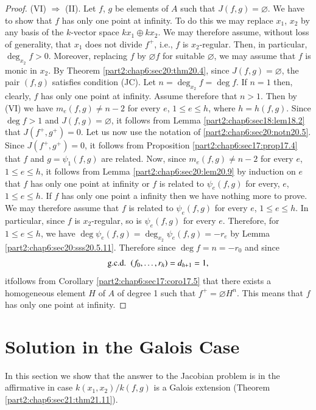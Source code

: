 \begin{proof}
(VI) $\Rightarrow$ (II). Let $f$, $g$ be elements of $A$ such that
$J(f, g) = \diameter$. We have to show that $f$ has only one point at
infinity. To do this we may replace $x_1$, $x_2$ by any basis of the
$k$-vector space $kx_1 \oplus kx_2$. We may therefore assume, without
loss of generality, that $x_1$ does not divide $f^+$, i.e., $f$ is
$x_2$-regular. Then, in particular, $\deg_{x_2} f> 0$. Moreover,
replacing $f$ by $\diameter f$ for suitable $\diameter$, we may assume
that $f$ is monic in $x_2$. By Theorem
\ref{part2:chap6:sec20:thm20.4}, since $J(f, g)= \diameter$, the pair
$(f, g)$ satisfies condition (JC). Let $n = \deg_{x_2}f= \deg f$. If
$n=1$ then, clearly, $f$ has only one point at infinity. Assume
therefore that $n > 1$. Then by (VI) we have $m_e (f, g) \neq n-2$ for
every $e$, $1 \leq e \leq h$, where $h= h(f, g)$. Since $\deg f> 1$
and $J(f, g)= \diameter$, it follows from Lemma
\ref{part2:chap6:sec18:lem18.2} that $J(f^+, g^+)=0$. Let us now use
the notation of \ref{part2:chap6:sec20:notn20.5}. Since $J(f^+,
g^+)=0$, it follows from Proposition \ref{part2:chap6:sec17:prop17.4}
that $f$ and $g= \psi_1 (f, g)$ are related. Now, since $m_e (f,
g)\neq n-2$ for every $e$, $1 \leq e \leq h$, it follows from Lemma
\ref{part2:chap6:sec20:lem20.9} by induction on $e$ that $f$ has only
one point at infinity or $f$ is related to $\psi_e (f, g)$ for every,
$e$, $1 \leq e \leq h$. If $f$ has only one point a infinity then we
have nothing more to prove. We may therefore assume that $f$ is
related to $\psi_e (f, g)$ for every $e$, $1 \leq e \leq h$. In
particular, since $f$ is $x_2$-regular, so is $\psi_e (f, g)$ for
every $e$. Therefore, for $1 \leq e \leq h$, we have $\deg \psi_e (f,
g)= \deg_{x_2} \psi_e (f, g)= - r_e$ by Lemma
\ref{part2:chap6:sec20:sss20.5.11}. Therefore since $\deg f = n = - r_0$
and since  
$$
\text{\gcd}~ (f_0, \ldots , r_h) = d_{h+1}=1,
$$
it\pageoriginale follows from Corollary
\ref{part2:chap6:sec17:coro17.5} that there exists a homogeneous
element $H$ of $A$ of degree 1 such that $f^+= \diameter H^n$. This
means that $f$ has only one point at infinity.
\end{proof}

\section{Solution in the Galois Case}\label{part2:chap6:sec21}

In this section we show that the answer to the Jacobian problem is in
the affirmative in case $k(x_1, x_2)/k(f, g)$ is a Galois extension
(Theorem \ref{part2:chap6:sec21:thm21.11}).

